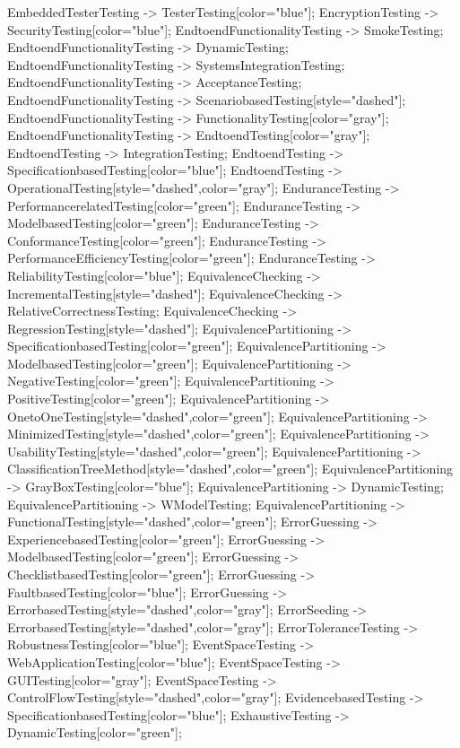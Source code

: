 \documentclass{article}
\begin{document}
{EmbeddedTesterTesting -> TesterTesting[color="blue"];
EncryptionTesting -> SecurityTesting[color="blue"];
EndtoendFunctionalityTesting -> SmokeTesting;
EndtoendFunctionalityTesting -> DynamicTesting;
EndtoendFunctionalityTesting -> SystemsIntegrationTesting;
EndtoendFunctionalityTesting -> AcceptanceTesting;
EndtoendFunctionalityTesting -> ScenariobasedTesting[style="dashed"];
EndtoendFunctionalityTesting -> FunctionalityTesting[color="gray"];
EndtoendFunctionalityTesting -> EndtoendTesting[color="gray"];
EndtoendTesting -> IntegrationTesting;
EndtoendTesting -> SpecificationbasedTesting[color="blue"];
EndtoendTesting -> OperationalTesting[style="dashed",color="gray"];
EnduranceTesting -> PerformancerelatedTesting[color="green"];
EnduranceTesting -> ModelbasedTesting[color="green"];
EnduranceTesting -> ConformanceTesting[color="green"];
EnduranceTesting -> PerformanceEfficiencyTesting[color="green"];
EnduranceTesting -> ReliabilityTesting[color="blue"];
EquivalenceChecking -> IncrementalTesting[style="dashed"];
EquivalenceChecking -> RelativeCorrectnessTesting;
EquivalenceChecking -> RegressionTesting[style="dashed"];
EquivalencePartitioning -> SpecificationbasedTesting[color="green"];
EquivalencePartitioning -> ModelbasedTesting[color="green"];
EquivalencePartitioning -> NegativeTesting[color="green"];
EquivalencePartitioning -> PositiveTesting[color="green"];
EquivalencePartitioning -> OnetoOneTesting[style="dashed",color="green"];
EquivalencePartitioning -> MinimizedTesting[style="dashed",color="green"];
EquivalencePartitioning -> UsabilityTesting[style="dashed",color="green"];
EquivalencePartitioning -> ClassificationTreeMethod[style="dashed",color="green"];
EquivalencePartitioning -> GrayBoxTesting[color="blue"];
EquivalencePartitioning -> DynamicTesting;
EquivalencePartitioning -> WModelTesting;
EquivalencePartitioning -> FunctionalTesting[style="dashed",color="green"];
ErrorGuessing -> ExperiencebasedTesting[color="green"];
ErrorGuessing -> ModelbasedTesting[color="green"];
ErrorGuessing -> ChecklistbasedTesting[color="green"];
ErrorGuessing -> FaultbasedTesting[color="blue"];
ErrorGuessing -> ErrorbasedTesting[style="dashed",color="gray"];
ErrorSeeding -> ErrorbasedTesting[style="dashed",color="gray"];
ErrorToleranceTesting -> RobustnessTesting[color="blue"];
EventSpaceTesting -> WebApplicationTesting[color="blue"];
EventSpaceTesting -> GUITesting[color="gray"];
EventSpaceTesting -> ControlFlowTesting[style="dashed",color="gray"];
EvidencebasedTesting -> SpecificationbasedTesting[color="blue"];
ExhaustiveTesting -> DynamicTesting[color="green"];
}
\end{document}
